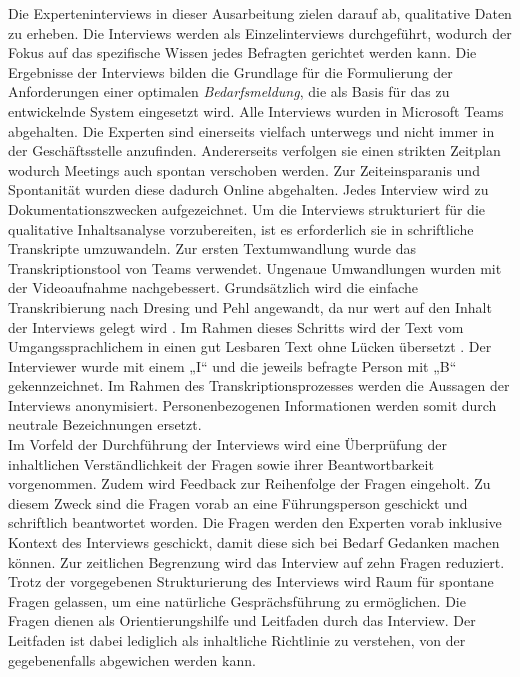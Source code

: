 Die Experteninterviews in dieser Ausarbeitung zielen darauf ab, qualitative Daten zu erheben. Die Interviews werden als Einzelinterviews durchgeführt, wodurch der Fokus auf das spezifische Wissen jedes Befragten gerichtet werden kann. Die Ergebnisse der Interviews bilden die Grundlage für die Formulierung der Anforderungen einer optimalen \emph{Bedarfsmeldung}, die als Basis für das zu entwickelnde System eingesetzt wird. Alle Interviews wurden in Microsoft Teams abgehalten. Die Experten sind einerseits vielfach unterwegs und nicht immer in der Geschäftsstelle anzufinden. Andererseits verfolgen sie einen strikten Zeitplan wodurch Meetings auch spontan verschoben werden. Zur Zeiteinsparanis und Spontanität wurden diese dadurch Online abgehalten. Jedes Interview wird zu Dokumentationszwecken aufgezeichnet. Um die Interviews strukturiert für die qualitative Inhaltsanalyse vorzubereiten, ist es erforderlich sie in schriftliche Transkripte umzuwandeln. Zur ersten Textumwandlung wurde das Transkriptionstool von Teams verwendet. Ungenaue Umwandlungen wurden mit der Videoaufnahme nachgebessert. Grundsätzlich wird die einfache Transkribierung nach Dresing und Pehl angewandt, da nur wert auf den Inhalt der Interviews gelegt wird \cite{dresing2015praxisbuch}. Im Rahmen dieses Schritts wird der Text vom Umgangssprachlichem in einen gut Lesbaren Text ohne Lücken übersetzt \cite{dresing2015praxisbuch}. Der Interviewer wurde mit einem „I“ und die jeweils befragte Person mit „B“ gekennzeichnet. Im Rahmen des Transkriptionsprozesses werden die Aussagen der Interviews anonymisiert. Personenbezogenen Informationen werden somit durch neutrale Bezeichnungen ersetzt.\\

Im Vorfeld der Durchführung der Interviews wird eine Überprüfung der inhaltlichen Verständlichkeit der Fragen sowie ihrer Beantwortbarkeit vorgenommen. Zudem wird Feedback zur Reihenfolge der Fragen eingeholt. Zu diesem Zweck sind die Fragen vorab an eine Führungsperson geschickt und schriftlich beantwortet worden. Die Fragen werden den Experten vorab inklusive Kontext des Interviews geschickt, damit diese sich bei Bedarf Gedanken machen können. Zur zeitlichen Begrenzung wird das Interview auf zehn Fragen reduziert. Trotz der vorgegebenen Strukturierung des Interviews wird Raum für spontane Fragen gelassen, um eine natürliche Gesprächsführung zu ermöglichen. Die Fragen dienen als Orientierungshilfe und Leitfaden durch das Interview. Der Leitfaden ist dabei lediglich als inhaltliche Richtlinie zu verstehen, von der gegebenenfalls abgewichen werden kann.

